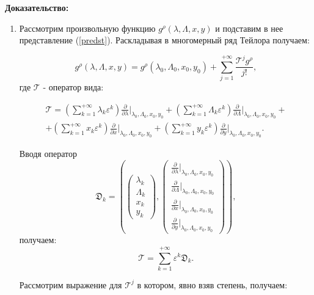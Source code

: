 \textbf{Доказательство:}\nopagebreak[4]

\begin{enumerate}

\item Рассмотрим произвольную функцию $g^\rho(\lambda,\Lambda,x,y)$ и подставим в нее представление (\ref{predst}). Раскладывая в многомерный ряд Тейлора получаем:

$$g^\rho(\lambda,\Lambda,x,y) = g^\rho(\lambda_0,\Lambda_0,x_0,y_0) + \sum_{j=1}^{+\infty} \frac{\mathcal{T}^j g^\rho}{j!},$$
где $\mathcal{T}$ - оператор вида:

\begin{multline*}
\mathcal{T} = 
\left(\sum_{k=1}^{+\infty} \lambda_k \varepsilon^k \right) \frac{\partial}{\partial \lambda} \bigg|_{\lambda_0,\Lambda_0,x_0,y_0}+
\left(\sum_{k=1}^{+\infty} \Lambda_k \varepsilon^k \right) \frac{\partial}{\partial \Lambda} \bigg|_{\lambda_0,\Lambda_0,x_0,y_0}+\\
+\left(\sum_{k=1}^{+\infty} x_k \varepsilon^k \right) \frac{\partial}{\partial x} \bigg|_{\lambda_0,\Lambda_0,x_0,y_0}
+\left(\sum_{k=1}^{+\infty} y_k \varepsilon^k \right) \frac{\partial}{\partial y} \bigg|_{\lambda_0,\Lambda_0,x_0,y_0}.
\end{multline*}

Вводя оператор
$$\mathfrak{D}_k = \left( \begin{pmatrix} \lambda_k\\ \Lambda_k \\ x_k \\ y_k \end{pmatrix},\begin{pmatrix} \frac{\partial}{\partial \lambda} |_{\lambda_0,\Lambda_0,x_0,y_0}\\ \frac{\partial}{\partial \Lambda} |_{\lambda_0,\Lambda_0,x_0,y_0} \\ \frac{\partial}{\partial x} |_{\lambda_0,\Lambda_0,x_0,y_0} \\ \frac{\partial}{\partial y} |_{\lambda_0,\Lambda_0,x_0,y_0} \end{pmatrix} \right),$$
получаем:
$$\mathcal{T} = \sum_{k=1}^{+\infty} \varepsilon^k \mathfrak{D}_k.$$


Рассмотрим выражение для $\mathcal{T}^j$ в котором, явно взяв степень, получаем:


\end{enumerate}
